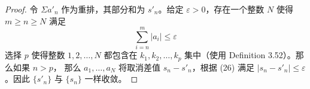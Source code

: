 \documentclass[../poma-notes.tex]{subfiles}
\begin{document}
\begin{proof}
  令 $\Sigma a'_n$ 作为重排，其部分和为 $s'_n$。给定 $\varepsilon > 0$，存在一个整数 $N$ 使得 $m \ge n \ge N$ 满足
  \begin{equation}
    \sum_{i=n}^{m} |a_i| \le \varepsilon
  \end{equation}
  选择 $p$ 使得整数 $1,2,\dots,N$ 都包含在 $k_1,k_2,\dots,k_p$ 集中（使用 Definition 3.52）。那么如果 $n > p$，
  那么 $a_1,\dots,a_N$ 将取消差值 $s_n - s'_n$，根据 (26) 满足 $|s_n - s'_n| \le \varepsilon$。因此 $\{s'_n\}$
  与 $\{s_n\}$ 一样收敛。
\end{proof}
\end{document}
